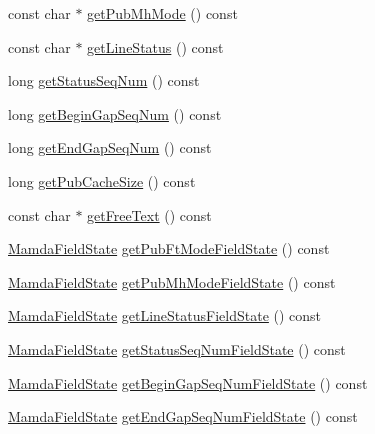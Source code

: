 \begin{CompactItemize}
const char $\ast$ \hyperlink{classWombat_1_1MamdaPubStatusListener_2cec9d2c120cdf4cfaab88ef273712aa}{get\-Pub\-Mh\-Mode} () const 
\item 
const char $\ast$ \hyperlink{classWombat_1_1MamdaPubStatusListener_6a41fa38621e9165330688951656e3c3}{get\-Line\-Status} () const 
\item 
long \hyperlink{classWombat_1_1MamdaPubStatusListener_a3125f864d901d9d788778238c50c370}{get\-Status\-Seq\-Num} () const 
\item 
long \hyperlink{classWombat_1_1MamdaPubStatusListener_ce7c4b6ae1c1508087ae25b2a8e1d61e}{get\-Begin\-Gap\-Seq\-Num} () const 
\item 
long \hyperlink{classWombat_1_1MamdaPubStatusListener_cb0a6dff2e7c85b4c299444c743f7b36}{get\-End\-Gap\-Seq\-Num} () const 
\item 
long \hyperlink{classWombat_1_1MamdaPubStatusListener_1ba02d9db2e8b657ec61b6de7d489e07}{get\-Pub\-Cache\-Size} () const 
\item 
const char $\ast$ \hyperlink{classWombat_1_1MamdaPubStatusListener_ac4c3ecbefe9170ecaa873e725cac4f3}{get\-Free\-Text} () const 
\item 
\hyperlink{namespaceWombat_93aac974f2ab713554fd12a1fa3b7d2a}{Mamda\-Field\-State} \hyperlink{classWombat_1_1MamdaPubStatusListener_b377a65c443b4a09b13d0e6a7c269ee9}{get\-Pub\-Ft\-Mode\-Field\-State} () const 
\item 
\hyperlink{namespaceWombat_93aac974f2ab713554fd12a1fa3b7d2a}{Mamda\-Field\-State} \hyperlink{classWombat_1_1MamdaPubStatusListener_94bb9e1391c14ff70c13813bd8598182}{get\-Pub\-Mh\-Mode\-Field\-State} () const 
\item 
\hyperlink{namespaceWombat_93aac974f2ab713554fd12a1fa3b7d2a}{Mamda\-Field\-State} \hyperlink{classWombat_1_1MamdaPubStatusListener_7e8e85060e206e639d9a61c608ddb48f}{get\-Line\-Status\-Field\-State} () const 
\item 
\hyperlink{namespaceWombat_93aac974f2ab713554fd12a1fa3b7d2a}{Mamda\-Field\-State} \hyperlink{classWombat_1_1MamdaPubStatusListener_d17d5c19c2ac8ca47502eea6a9931845}{get\-Status\-Seq\-Num\-Field\-State} () const 
\item 
\hyperlink{namespaceWombat_93aac974f2ab713554fd12a1fa3b7d2a}{Mamda\-Field\-State} \hyperlink{classWombat_1_1MamdaPubStatusListener_df5268fab3cedd4a767fbb8f3e29e7ec}{get\-Begin\-Gap\-Seq\-Num\-Field\-State} () const 
\item 
\hyperlink{namespaceWombat_93aac974f2ab713554fd12a1fa3b7d2a}{Mamda\-Field\-State} \hyperlink{classWombat_1_1MamdaPubStatusListener_54fd8bef174d993cc0c9f5710f585b07}{get\-End\-Gap\-Seq\-Num\-Field\-State} () const 

\end{CompactItemize}
